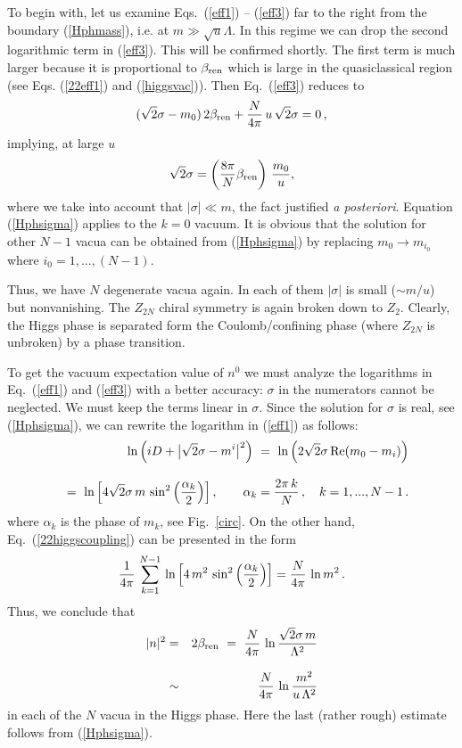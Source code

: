 \documentclass[epsfig,12pt]{article}
\def\beq{\begin{equation}}
\def\eeq{\end{equation}}
\def\beqn{\begin{eqnarray}}
\def\eeqn{\end{eqnarray}}
\def\beqn{\begin{eqnarray}}
\def\eeqn{\end{eqnarray}}
\def\beq{\begin{equation}}
\def\eeq{\end{equation}}
\begin{document}
{To begin with, let us examine  Eqs.~(\ref{eff1}) -- (\ref{eff3}) 
far to the right from the boundary (\ref{Hphmass}), i.e. 
at $m\gg \sqrt{u}\Lambda$. 
In this regime we can drop the second logarithmic term in (\ref{eff3}).
This will be confirmed shortly.
 The first
term is much larger because it is   proportional to $\beta_{\rm ren}$ which is large in the quasiclassical region
(see Eqs. (\ref{22eff1}) and  (\ref{higgsvac})). Then Eq.~(\ref{eff3}) reduces to
\beq
(\sqrt{2}\sigma -m_0)\,2\beta_{\rm ren}+\frac{N}{4\pi}\,u\,\sqrt{2}\sigma =0 \,,
\eeq
implying, at large $u$  
\beq
\sqrt{2}\sigma=\left(\frac{8\pi}{N}\beta_{\rm ren}\right)\,\frac{m_{{0}}}{u},
\label{Hphsigma}
\eeq
where we take into account 
 that $|\sigma |\ll m$, the fact justified {\em a posteriori}. Equation (\ref{Hphsigma}) applies to the 
 $k=0$ vacuum. It is obvious that the solution for other $N-1$ vacua can be obtained
 from (\ref{Hphsigma})  by replacing $m_0\to m_{i_0}$ where $i_0=1,...,(N-1)$.

Thus, we have $N$ degenerate vacua again. In each of them $|\sigma |$ is small ($\sim m/u$) but
nonvanishing. The $Z_{2N}$ chiral symmetry is again broken down to $Z_2$. Clearly, the 
Higgs phase is separated form the Coulomb/confining phase (where $Z_{2N}$ is unbroken) by
a phase transition. 

To get the vacuum expectation value of $n^{0}$ we must analyze the logarithms in Eq.~(\ref{eff1}) and (\ref{eff3})
with a better accuracy: $\sigma$ in the numerators cannot be neglected. We must keep the terms linear in $\sigma$.
Since the solution for $\sigma$ is real, see (\ref{Hphsigma}), 
we can rewrite the logarithm in (\ref{eff1}) as follows:
\beqn
&&
{\rm ln}\left( i D + \bigl| \sqrt{2}\sigma -  m^i \bigr|^2 \right)
~=~
{\rm ln}\left(2\sqrt{2} \sigma\,{\rm Re} (m_0 - m_i)\right)
\nonumber\\[3mm]
&&=~
{\rm ln}\left[4\sqrt{2} \sigma\, m\, \sin^2\left(\frac{\alpha_k}{2}\right)\right],\qquad \alpha_k =\frac{2\pi\,k}{N}\,,
\quad k= 1,..., N-1\,.
\label{hujone}
\eeqn
where $\alpha_k$ is the phase of $m_k$, see Fig.~\ref{circ}. On the other hand, Eq.~(\ref{22higgscoupling})
can be presented in the form
\beq
\frac{1}{4\pi}\, \sum_{k=1}^{N-1} \, {\rm ln}\left[4\, m^2\, \sin^2\left(\frac{\alpha_k}{2}\right)\right]
= \frac{N}{4\pi}\,\ln m^2\,.
\label{hujtwo}
\eeq
Thus, we conclude that
\beqn
|n|^2 
&=&
2\beta_{\rm ren} ~=~ \frac{N}{4\pi}\, \ln \frac{\sqrt{2}\sigma\, m}{\Lambda^2} 
\nonumber\\[3mm]
&\sim&
  \frac{N}{4\pi}\, \ln \frac{ m^2}{u\,\Lambda^2} 
\label{hujthree}
\eeqn
in each of the $N$ vacua in the Higgs phase. Here the last (rather rough) estimate follows from (\ref{Hphsigma}).

}
\end{document}
